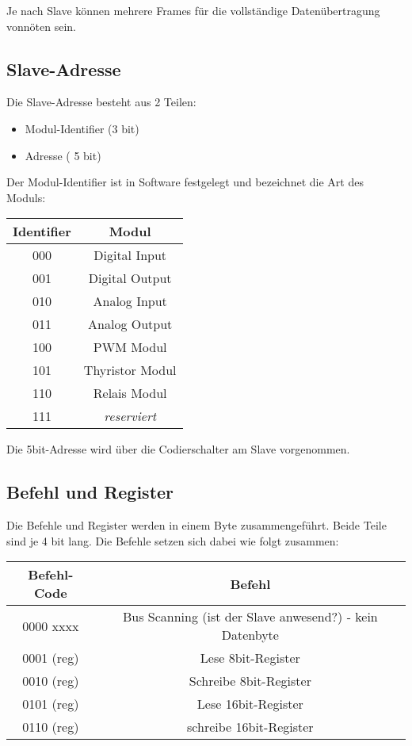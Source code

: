 Je nach Slave können mehrere Frames für die vollständige Datenübertragung vonnöten sein. 

\subsection{Slave-Adresse}
Die Slave-Adresse besteht aus 2 Teilen:
\begin{itemize}
    \item Modul-Identifier (3 bit)
    \item Adresse ( 5 bit)
\end{itemize}

Der Modul-Identifier ist in Software festgelegt und bezeichnet die Art des Moduls:

\begin{table}[H]
    \centering
        \begin{tabular}{|c|c|}
            \hline
            Identifier & Modul \\ \hline \hline
            000 & Digital Input \\ \hline
            001 & Digital Output \\ \hline
            010 & Analog Input \\ \hline
            011 & Analog Output \\ \hline
            100 & PWM Modul \\ \hline
            101 & Thyristor Modul \\ \hline
            110 & Relais Modul \\ \hline
            111 & \textit{reserviert}    \\ \hline
        \end{tabular}
\end{table}

Die 5bit-Adresse wird über die Codierschalter am Slave vorgenommen.

\subsection{Befehl und Register}

Die Befehle und Register werden in einem Byte zusammengeführt. Beide Teile sind je 4 bit lang. Die Befehle setzen sich dabei wie folgt zusammen:

\begin{table}[H]
    \centering
        \begin{tabular}{|c|c|}
            \hline
            Befehl-Code & Befehl \\ \hline \hline
            0000 xxxx   & Bus Scanning (ist der Slave anwesend?) - kein Datenbyte \\ \hline
            0001 (reg)  & Lese 8bit-Register\\ \hline
            0010 (reg)  & Schreibe 8bit-Register \\ \hline
            0101 (reg)  & Lese 16bit-Register \\ \hline
            0110 (reg)  & schreibe 16bit-Register \\ \hline
        \end{tabular}
\end{table}


